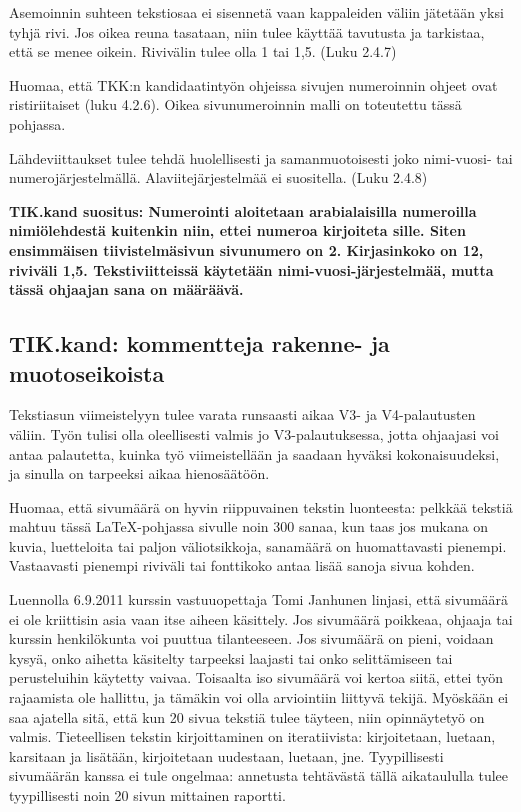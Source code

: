 Asemoinnin suhteen tekstiosaa ei sisennetä vaan kappaleiden väliin
jätetään yksi tyhjä rivi. Jos oikea reuna tasataan, niin tulee käyttää
tavutusta ja tarkistaa, että se menee oikein.  Rivivälin tulee olla 1
tai 1,5. (Luku 2.4.7)

Huomaa, että TKK:n kandidaatintyön ohjeissa sivujen numeroinnin ohjeet
ovat ristiriitaiset (luku 4.2.6). Oikea sivunumeroinnin malli on
toteutettu tässä pohjassa.  

Lähdeviittaukset tulee tehdä huolellisesti ja samanmuotoisesti joko
nimi-vuosi- tai numerojärjestelmällä. Alaviitejärjestelmää ei
suositella. (Luku 2.4.8)

\textbf{TIK.kand suositus: Numerointi aloitetaan arabialaisilla
  numeroilla nimiölehdestä kuitenkin niin, ettei numeroa kirjoiteta
  sille. Siten ensimmäisen tiivistelmäsivun sivunumero on 2. 
  Kirjasinkoko on 12, riviväli 1,5. Tekstiviitteissä käytetään
  nimi-vuosi-järjestelmää, mutta tässä ohjaajan sana on määräävä.}

\subsection{TIK.kand: kommentteja rakenne- ja muotoseikoista}

Tekstiasun viimeistelyyn tulee varata runsaasti aikaa V3- ja
V4-palautusten väliin. Työn tulisi olla oleellisesti valmis jo
V3-palautuksessa, jotta ohjaajasi voi antaa palautetta, kuinka työ
viimeistellään ja saadaan hyväksi kokonaisuudeksi, ja sinulla on 
tarpeeksi aikaa hienosäätöön.

Huomaa, että sivumäärä on hyvin riippuvainen tekstin luonteesta:
pelkkää tekstiä mahtuu tässä \LaTeX{}-pohjassa sivulle noin 300 sanaa,
kun taas jos mukana on kuvia, luetteloita tai paljon väliotsikkoja,
sanamäärä on huomattavasti pienempi. Vastaavasti pienempi riviväli tai
fonttikoko antaa lisää sanoja sivua kohden.

Luennolla 6.9.2011 kurssin vastuuopettaja Tomi Janhunen linjasi, että
sivumäärä ei ole kriittisin asia vaan itse aiheen käsittely.  Jos
sivumäärä poikkeaa, ohjaaja tai kurssin henkilökunta voi puuttua
tilanteeseen. Jos sivumäärä on pieni, voidaan kysyä, onko aihetta
käsitelty tarpeeksi laajasti tai onko selittämiseen tai perusteluihin
käytetty vaivaa. Toisaalta iso sivumäärä voi kertoa siitä, ettei työn
rajaamista ole hallittu, ja tämäkin voi olla arviointiin liittyvä
tekijä. Myöskään ei saa ajatella sitä, että kun 20 sivua tekstiä tulee
täyteen, niin opinnäytetyö on valmis. Tieteellisen tekstin
kirjoittaminen on iteratiivista: kirjoitetaan, luetaan, karsitaan ja
lisätään, kirjoitetaan uudestaan, luetaan, jne. Tyypillisesti
sivumäärän kanssa ei tule ongelmaa: annetusta tehtävästä tällä
aikataululla tulee tyypillisesti noin 20 sivun mittainen raportti.

